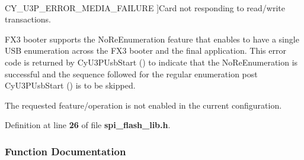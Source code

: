 $$\begin{Desc}
\begin{description}
{C\+Y\+\_\+\+U3\+P\+\_\+\+E\+R\+R\+O\+R\+\_\+\+M\+E\+D\+I\+A\+\_\+\+F\+A\+I\+L\+U\+RE\label{spi__flash__lib_8h_af668bfc4c39252082d2e9d4c221a9e12ae0df3263f83ada4b9c1572691c7b85f3}
}]Card not responding to read/write transactions. \item[{\em 
C\+Y\+\_\+\+U3\+P\+\_\+\+E\+R\+R\+O\+R\+\_\+\+N\+O\+\_\+\+R\+E\+E\+N\+U\+M\+\_\+\+R\+E\+Q\+U\+I\+R\+ED\label{spi__flash__lib_8h_af668bfc4c39252082d2e9d4c221a9e12a628356834f1b0ea8c452b4cada6bb1cb}
}]F\+X3 booter supports the No\+Re\+Enumeration feature that enables to have a single U\+SB enumeration across the F\+X3 booter and the final application. This error code is returned by Cy\+U3\+P\+Usb\+Start () to indicate that the No\+Re\+Enumeration is successful and the sequence followed for the regular enumeration post Cy\+U3\+P\+Usb\+Start () is to be skipped. \item[{\em 
C\+Y\+\_\+\+U3\+P\+\_\+\+E\+R\+R\+O\+R\+\_\+\+O\+P\+E\+R\+N\+\_\+\+D\+I\+S\+A\+B\+L\+ED\label{spi__flash__lib_8h_af668bfc4c39252082d2e9d4c221a9e12a2fa7645188a571e0c32e833ab4e2dac9}
}]The requested feature/operation is not enabled in the current configuration. \end{description}
\end{Desc}


Definition at line {\bf 26} of file {\bf spi\+\_\+flash\+\_\+lib.\+h}.



\subsubsection{Function Documentation}
